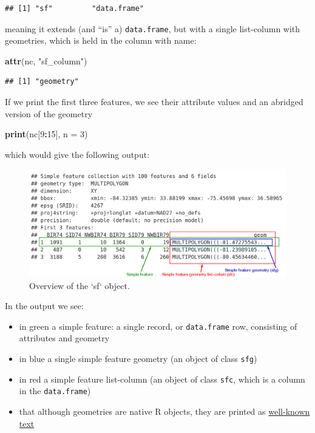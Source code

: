 \documentclass[
]{book}
\newenvironment{Shaded}{\begin{snugshade}}{\end{snugshade}}
\newcommand{\AttributeTok}[1]{\textcolor[rgb]{0.13,0.29,0.53}{#1}}
\newcommand{\DecValTok}[1]{\textcolor[rgb]{0.00,0.00,0.81}{#1}}
\newcommand{\FunctionTok}[1]{\textcolor[rgb]{0.13,0.29,0.53}{\textbf{#1}}}
\newcommand{\NormalTok}[1]{#1}
\newcommand{\SpecialCharTok}[1]{\textcolor[rgb]{0.81,0.36,0.00}{\textbf{#1}}}
\newcommand{\StringTok}[1]{\textcolor[rgb]{0.31,0.60,0.02}{#1}}
\providecommand{\tightlist}{%
  \setlength{\itemsep}{0pt}\setlength{\parskip}{0pt}}
\begin{document}
\begin{verbatim}
## [1] "sf"         "data.frame"
\end{verbatim}

meaning it extends (and ``is'' a) \texttt{data.frame}, but with a single list-column with geometries, which is held in the column with name:

\begin{Shaded}
\begin{Highlighting}[]
\FunctionTok{attr}\NormalTok{(nc, }\StringTok{"sf\_column"}\NormalTok{)}
\end{Highlighting}
\end{Shaded}

\begin{verbatim}
## [1] "geometry"
\end{verbatim}

If we print the first three features, we see their attribute values and an abridged version of the geometry

\begin{Shaded}
\begin{Highlighting}[]
\FunctionTok{print}\NormalTok{(nc[}\DecValTok{9}\SpecialCharTok{:}\DecValTok{15}\NormalTok{], }\AttributeTok{n =} \DecValTok{3}\NormalTok{)}
\end{Highlighting}
\end{Shaded}

which would give the following output:

\begin{figure}

{\centering \includegraphics[width=1\linewidth]{images/sf_xfig} 

}

\caption{Overview of the `sf` object.}\label{fig:Sf-overview}
\end{figure}

In the output we see:

\begin{itemize}
\tightlist
\item
  in green a simple feature: a single record, or \texttt{data.frame} row, consisting of attributes and geometry
\item
  in blue a single simple feature geometry (an object of class \texttt{sfg})
\item
  in red a simple feature list-column (an object of class \texttt{sfc}, which is a column in the \texttt{data.frame})
\item
  that although geometries are native R objects, they are printed as \protect\hyperlink{wkb}{well-known text}
\end{itemize}
\end{document}
